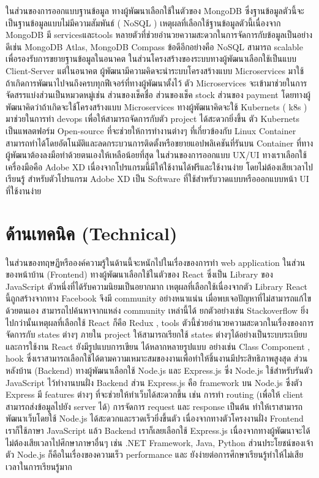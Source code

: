 ในส่วนของการออกแบบฐานข้อมูล ทางผู้พัฒนาเลือกใช้ในตัวของ MongoDB \cite{MongoDB} ซึ่งฐานข้อมูลตัวนี้จะเป็นฐานข้อมูลแบบไม่มีความสัมพันธ์ ( NoSQL ) 
เหตุผลที่เลือกใช้ฐานข้อมูลตัวนี้เนื่องจาก MongoDB มี servicesและtools หลายตัวที่ช่วยอำนวยความสะดวกในการจัดการกับข้อมูลเป็นอย่างดีเช่น MongoDB Atlas, MongoDB Compass 
ข้อดีอีกอย่างคือ NoSQL สามารถ scalable เพื่อรองรับการขยายฐานข้อมูลในอนาคต ในส่วนโครงสร้างของระบบทางผู้พัฒนาเลือกใช้เป็นแบบ Client-Server \cite{Client-Server} แต่ในอนาคต  ผู้พัฒนามีความคิดจะนำระบบโครงสร้างแบบ Microservices \cite{Microservice} มาใช้ ถ้าเกิดการพัฒนาไปจนถึงครบทุกฟีเจอร์ที่ทางผู้พัฒนาตั้งไว้  
ตัว Microservices จะเข้ามาช่วยในการจัดสรรแบ่งส่วนเป็นหมวดหมู่เช่น  ส่วนของเช็คชื่อ  ส่วนของเช็ค stock  ส่วนของ payment  โดยทางผู้พัฒนาคิดว่าถ้าเกิดจะใช้โครงสร้างแบบ Microservices ทางผู้พัฒนาคิดจะใช้ Kubernets ( k8s ) มาช่วยในการทำ devops เพื่อให้สามารถจัดการกับตัว project ได้สะดวกยิ่งขึ้น 
ตัว Kubernets เป็นแพลตฟอร์ม Open-source ที่จะช่วยให้การทำงานต่างๆ ที่เกี่ยวข้องกับ Linux Container สามารถทำได้โดยอัตโนมัติและลดกระบวนการติดตั้งหรือขยายแอปพลิเคชันที่รันบน Container ที่ทางผู้พัฒนาต้องลงมือทำด้วยตนเองให้เหลือน้อยที่สุด 
	ในส่วนของการออกแบบ UX/UI ทางเราเลือกใช้เครื่องมือคือ Adobe XD \cite{AdobeXD} เนื่องจากโปรแกรมนี้มีให้ใช้งานได้ฟรีและใช้งานง่าย โดยไม่ต้องเสียเวลาไปเรียนรู้ สำหรับตัวโปรแกรม Adobe XD เป็น Software ที่ใช้สำหรับวาดแบบหรือออกแบบหน้า UI ที่ใช้งานง่าย 
  
  
  

\section{ด้านเทคนิค (Technical)}
ในส่วนของทฤษฏีหรือองค์ความรู้ในด้านนี้จะหนักไปในเรื่องของการทำ
web application ในส่วนของหน้าบ้าน (Frontend) ทางผู้พัฒนาเลือกใช้ในตัวของ
React \cite{React} ซึ่งเป็น Library ของ JavaScript ตัวหนึ่งที่ได้รับความนิยมเป็นอยากมาก เหตุผลที่เลือกใช้เนื่องจากตัว Library React นี้ถูกสร้างจากทาง Facebook 
จึงมี community อย่างหนาแน่น  เมื่อพบเจอปัญหาที่ไม่สามารถแก้ไขด้วยตนเอง สามารถไปค้นหาจากแหล่ง community เหล่านี้ได้ ยกตัวอย่างเช่น Stackoverflow 
ยิ่งไปกว่านั้นเหตุผลที่เลือกใช้ React ก็คือ Redux \cite{Redux},  tools ตัวนี้ช่วยอำนวยความสะดวกในเรื่องของการจัดการกับ states ต่างๆ  ภายใน project ให้สามารถเรียกใช้ states ต่างๆได้อย่างเป็นระบบระเบียบและการใช้งาน React ยังมีรูปแบบการเขียน
ได้หลากหลายรูปแบบ อย่างเช่น Class Component , hook ซึ่งเราสามารถเลือกใช้ได้ตามความเหมาะสมของงานเพื่อทำให้ชิ้นงานมีประสิทธิภาพสูงสุด
ส่วนหลังบ้าน (Backend) ทางผู้พัฒนาเลือกใช้ Node.js \cite{NodeJs}
และ Express.js \cite{Express} ซึ่ง Node.js ใช้สำหรับรันตัว JavaScript ไว้ทำงานบนฝั่ง Backend ส่วน Express.js คือ  framework บน Node.js 
ซึ่งตัว Express มี features ต่างๆ  ที่จะช่วยให้ทำเว็บได้สะดวกขึ้น เช่น การทำ routing (เพื่อให้ client สามารถส่งข้อมูลไปยัง server ได้) การจัดการ request และ response เป็นต้น  ทำให้เราสามารถพัฒนาเว็บโดยใช้ Node.js ได้สะดวกและรวดเร็วยิ่งขึ้นตัว
เนื่องจากทางตัวโครงงานฝั่ง Frontend เราก็ใช้ภาษา JavaScript แล้ว Backend เราก็เลยเลือกใช้ Express.js  เนื่องจากทางผู้พัฒนาจะได้ไม่ต้องเสียเวลาไปศึกษาภาษาอื่นๆ เช่น .NET Framework, Java, Python 
ส่วนประโยชน์ของเจ้าตัว Node.js ก็คือในเรื่องของความเร็ว performance และ ยังง่ายต่อการศึกษาเรียนรู้ทำให้ไม่เสียเวลาในการเรียนรู้มาก




